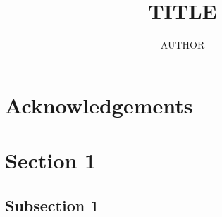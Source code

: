 \documentclass[12pt]{article}
\title{\large\bfseries{TITLE}}
\author{\normalsize{AUTHOR}}
\date{}
\begin{document}
\maketitle
\abstract{\lipsum[1-1]}

\tableofcontents

\vspace{4em}
\pagestyle{fancy}

\section*{Acknowledgements}
\lipsum[1-1]

\section{Section 1}

\lipsum[1-5]
\subsection{Subsection 1}
\lipsum[1-5]


\printbibliography
\end{document}
